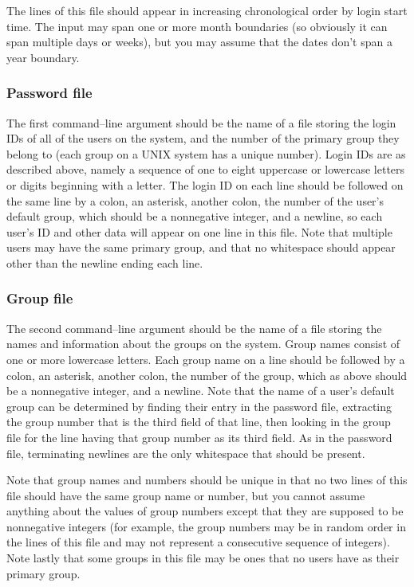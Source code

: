 \documentclass[11pt]{article}
\begin{document}
        \vspace{-2.5mm}

        The lines of this file should appear in increasing chronological order
      by login start time.  The input may span one or more month boundaries
      (so obviously it can span multiple days or weeks), but you may assume
      that the dates don't span a year boundary.

      \subsubsection{Password file}

        The first command--line argument should be the name of a file storing
      the login IDs of all of the users on the system, and the number of the
      primary group they belong to (each group on a UNIX system
      has a unique number).  Login IDs are as described above, namely a
      sequence of one to eight uppercase or lowercase letters or digits
      beginning with a letter.  The login ID on each line should be followed
      on the same line by a colon, an asterisk, another colon, the number of
      the user's default group, which should be a nonnegative integer, and a
      newline, so each user's ID and other data will appear on one line in
      this file.  Note that multiple users may have the same primary group,
      and that no whitespace should appear other than the newline ending
      each line.

      \subsubsection{Group file}

        The second command--line argument should be the name of a file storing
      the names and information about the groups on the system.  Group names
      consist of one or more lowercase letters.  Each group name on a line
      should be followed by a colon, an asterisk, another colon, the number
      of the group, which as above should be a nonnegative integer, and a
      newline.  Note that the name of a user's default group can be
      determined by finding their entry in the password file, extracting the
      group number that is the third field of that line, then looking in the
      group file for the line having that group number as its third field.
      As in the password file, terminating newlines are the only whitespace
      that should be present.

        Note that group names and numbers should be unique in that no two
      lines of this file should have the same group name or number, but you
      cannot assume anything about the values of group numbers except that
      they are supposed to be nonnegative integers (for example, the group
      numbers may be in random order in the lines of this file and may not
      represent a consecutive sequence of integers).  Note lastly that some
      groups in this file may be ones that no users have as their primary
      group.
\end{document}
